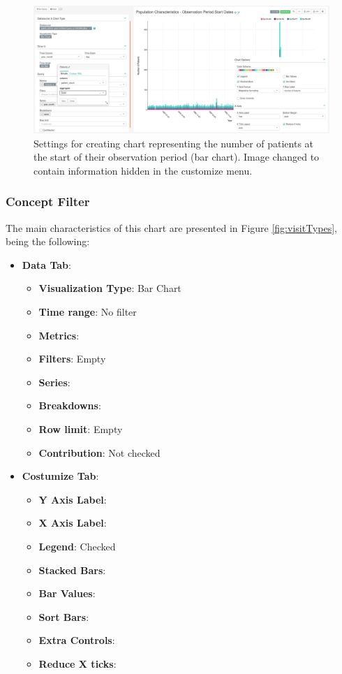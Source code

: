 \documentclass[]{book}
\providecommand{\tightlist}{%
  \setlength{\itemsep}{0pt}\setlength{\parskip}{0pt}}
\begin{document}
\begin{figure}
\includegraphics[width=1\linewidth]{images/populationCharacteristicsObservationPeriodStartDates} \caption{Settings for creating chart representing the number of patients at the start of their observation period (bar chart). Image changed to contain information hidden in the customize menu.}\label{fig:visitTypes6}
\end{figure}

\subsubsection{Concept Filter}\label{concept-filter}

The main characteristics of this chart are presented in Figure
\ref{fig:visitTypes}, being the following:

\begin{itemize}
\tightlist
\item
  \textbf{Data Tab}:

  \begin{itemize}
  \tightlist
  \item
    \textbf{Visualization Type}: Bar Chart
  \item
    \textbf{Time range}: No filter
  \item
    \textbf{Metrics}:
  \item
    \textbf{Filters}: Empty
  \item
    \textbf{Series}:
  \item
    \textbf{Breakdowns}:
  \item
    \textbf{Row limit}: Empty
  \item
    \textbf{Contribution}: Not checked
  \end{itemize}
\item
  \textbf{Costumize Tab}:

  \begin{itemize}
  \tightlist
  \item
    \textbf{Y Axis Label}:
  \item
    \textbf{X Axis Label}:
  \item
    \textbf{Legend}: Checked
  \item
    \textbf{Stacked Bars}:
  \item
    \textbf{Bar Values}:
  \item
    \textbf{Sort Bars}:
  \item
    \textbf{Extra Controls}:
  \item
    \textbf{Reduce X ticks}:
  \end{itemize}
\end{itemize}
\end{document}
